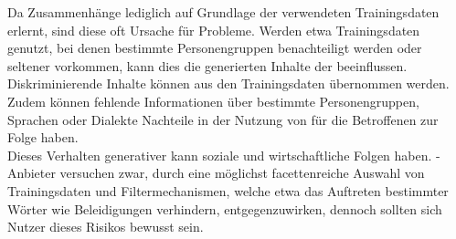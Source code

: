 \documentclass[../main.tex]{subfiles}
\begin{document}
Da  Zusammenhänge lediglich auf Grundlage der verwendeten Trainingsdaten erlernt, sind diese oft Ursache für Probleme. Werden etwa Trainingsdaten genutzt, 
bei denen bestimmte Personengruppen benachteiligt werden oder seltener vorkommen, kann dies die generierten Inhalte der  beeinflussen. Diskriminierende Inhalte können aus den Trainingsdaten 
übernommen werden. Zudem können fehlende Informationen über bestimmte Personengruppen, Sprachen oder Dialekte Nachteile in der Nutzung von  für die Betroffenen zur Folge haben.\\ 
Dieses Verhalten generativer  kann soziale und wirtschaftliche Folgen haben. -Anbieter versuchen zwar, durch eine möglichst 
facettenreiche Auswahl von Trainingsdaten und Filtermechanismen, welche etwa das Auftreten bestimmter Wörter wie Beleidigungen verhindern, entgegenzuwirken, 
dennoch sollten sich Nutzer dieses Risikos bewusst sein.\\
\end{document}
